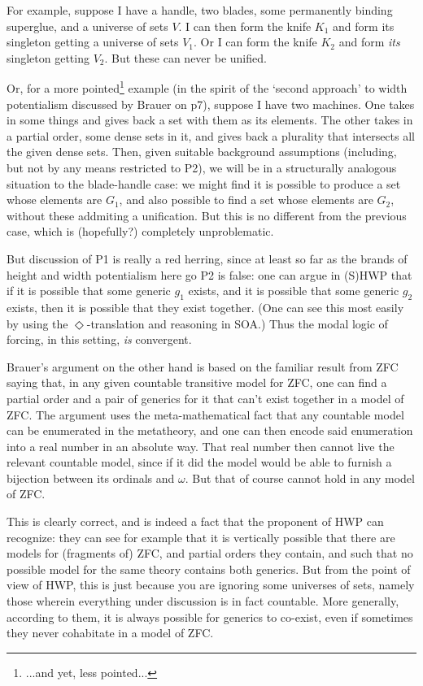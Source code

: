 \documentclass{article}
\begin{document}
For example, suppose I have a handle, two blades, some permanently 
binding superglue, and a universe of sets $V$. I can then form the knife $K_1$
and form its singleton getting a universe of sets $V_1$. Or I can form 
the knife $K_2$ and form \emph{its} singleton getting $V_2$. But these 
can never be unified. 

Or, for a more pointed\footnote{...and yet, less pointed...} example (in the spirit of the `second approach' to width 
potentialism discussed by Brauer on p7), suppose I have two machines. 
One takes in some things and gives back a set with them as its elements.
The other takes in a 
partial order, some dense sets in it, and gives back a plurality that 
intersects all the given dense sets. Then, given suitable background assumptions 
(including, but not by any means restricted to P2),
we will be in a structurally analogous situation to the blade-handle 
case: we might find it is possible to produce a set whose elements are $G_1$,
and also possible to find a set whose elements are $G_2$,
without these addmiting a unification.
But this is no different from the previous case, which is (hopefully?) completely 
unproblematic.

But discussion of P1 is really a red herring, since at least so far as the 
brands of height and width potentialism here go P2 is false:
one can argue in (S)HWP that if it is possible that some generic 
$g_1$ exists, and it is possible that some generic $g_2$ exists, then it is 
possible that they exist together. (One can see this most easily by using 
the $\Diamond$-translation and reasoning in SOA.) 
Thus the modal logic of forcing, in this 
setting, \emph{is} convergent. 

Brauer's argument on the other hand is based on the familiar result from ZFC saying 
that, in any given countable transitive model for ZFC, one can find a partial 
order and a pair of generics for it that can't exist together in a model of ZFC.
The argument uses the meta-mathematical fact that any countable model can be 
enumerated in the metatheory, and one can then encode said enumeration into a 
real number in an absolute way. That real number then cannot live the relevant 
countable model, since if it did the model would be able to furnish a bijection 
between its ordinals and $\omega$. But that of course cannot hold in any model of ZFC.

This is clearly correct, and is indeed a fact that the proponent of HWP can 
recognize: they can see for example that it is vertically possible that there
are models for (fragments of) ZFC, and partial orders they contain, and such that no 
possible model for the same theory contains both generics. But from the point of 
view of HWP, this is just because you are ignoring some universes of sets, namely those 
wherein everything under discussion is in fact countable. More generally, according 
to them, it is always possible for generics to co-exist, even if 
sometimes they never cohabitate in a model of ZFC.
\end{document}
